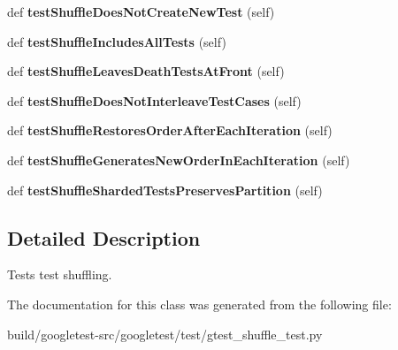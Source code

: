 \begin{DoxyCompactItemize}
def {\bfseries test\+Shuffle\+Does\+Not\+Create\+New\+Test} (self)
\item 
\mbox{\label{classgtest__shuffle__test_1_1GTestShuffleUnitTest_ab9e25e62817f7cdbd32833f9b2be5794}} 
def {\bfseries test\+Shuffle\+Includes\+All\+Tests} (self)
\item 
\mbox{\label{classgtest__shuffle__test_1_1GTestShuffleUnitTest_a6fa91b262595e35bd3e9b52e188dc634}} 
def {\bfseries test\+Shuffle\+Leaves\+Death\+Tests\+At\+Front} (self)
\item 
\mbox{\label{classgtest__shuffle__test_1_1GTestShuffleUnitTest_a34bfc9696191f4c2782327e1e35ae902}} 
def {\bfseries test\+Shuffle\+Does\+Not\+Interleave\+Test\+Cases} (self)
\item 
\mbox{\label{classgtest__shuffle__test_1_1GTestShuffleUnitTest_a77b83a9870ad8d68524e1177f5320fb0}} 
def {\bfseries test\+Shuffle\+Restores\+Order\+After\+Each\+Iteration} (self)
\item 
\mbox{\label{classgtest__shuffle__test_1_1GTestShuffleUnitTest_ada78bae27e0d82d07bd663d53a36552b}} 
def {\bfseries test\+Shuffle\+Generates\+New\+Order\+In\+Each\+Iteration} (self)
\item 
\mbox{\label{classgtest__shuffle__test_1_1GTestShuffleUnitTest_abd33c5ef01ce6d1d025ebcc816d47c19}} 
def {\bfseries test\+Shuffle\+Sharded\+Tests\+Preserves\+Partition} (self)
\end{DoxyCompactItemize}


\subsection{Detailed Description}
\begin{DoxyVerb}Tests test shuffling.\end{DoxyVerb}
 

The documentation for this class was generated from the following file\+:\begin{DoxyCompactItemize}
\item 
build/googletest-\/src/googletest/test/gtest\+\_\+shuffle\+\_\+test.\+py\end{DoxyCompactItemize}
